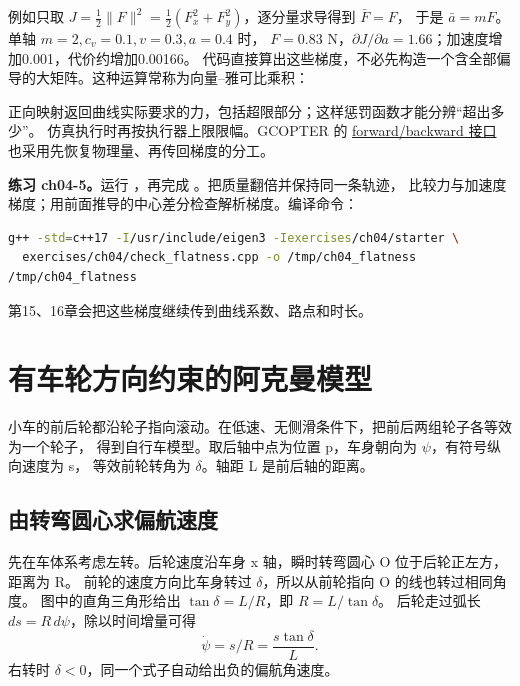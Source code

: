 例如只取 $J=\frac12\|F\|^2=\frac12(F_x^2+F_y^2)$，逐分量求导得到 $\bar F=F$，
于是 $\bar a=mF$。单轴 $m=2,c_v=0.1,v=0.3,a=0.4$ 时，
$F=0.83$ N，$\partial J/\partial a=1.66$；加速度增加0.001，代价约增加0.00166。
代码直接算出这些梯度，不必先构造一个含全部偏导的大矩阵。这种运算常称为向量--雅可比乘积：
\par\noindent\begin{minipage}{\linewidth}

\end{minipage}\par
正向映射返回曲线实际要求的力，包括超限部分；这样惩罚函数才能分辨“超出多少”。
仿真执行时再按执行器上限限幅。GCOPTER 的
\href{https://github.com/ZJU-FAST-Lab/GCOPTER/blob/e0444f6d47b84f972ced91746b05feb36ce1fd4f/gcopter/include/gcopter/flatness.hpp}{forward/backward 接口}
也采用先恢复物理量、再传回梯度的分工。

\textbf{练习 ch04-5。}运行 ，再完成
。把质量翻倍并保持同一条轨迹，
比较力与加速度梯度；用前面推导的中心差分检查解析梯度。编译命令：
\begin{lstlisting}[language=bash,numbers=none]
g++ -std=c++17 -I/usr/include/eigen3 -Iexercises/ch04/starter \
  exercises/ch04/check_flatness.cpp -o /tmp/ch04_flatness
/tmp/ch04_flatness
\end{lstlisting}
第15、16章会把这些梯度继续传到曲线系数、路点和时长。

\section{有车轮方向约束的阿克曼模型}\label{sec:ackermann}
小车的前后轮都沿轮子指向滚动。在低速、无侧滑条件下，把前后两组轮子各等效为一个轮子，
得到自行车模型。取后轴中点为位置 p，车身朝向为 $\psi$，有符号纵向速度为 s，
等效前轮转角为 $\delta$。轴距 L 是前后轴的距离。

\subsection*{由转弯圆心求偏航速度}
先在车体系考虑左转。后轮速度沿车身 x 轴，瞬时转弯圆心 O 位于后轮正左方，距离为 R。
前轮的速度方向比车身转过 $\delta$，所以从前轮指向 O 的线也转过相同角度。
图中的直角三角形给出 $\tan\delta=L/R$，即 $R=L/\tan\delta$。
后轮走过弧长 $ds=R\,d\psi$，除以时间增量可得
\begin{equation}
\dot\psi=s/R=\frac{s\tan\delta}{L}.
\end{equation}
右转时 $\delta<0$，同一个式子自动给出负的偏航角速度。

